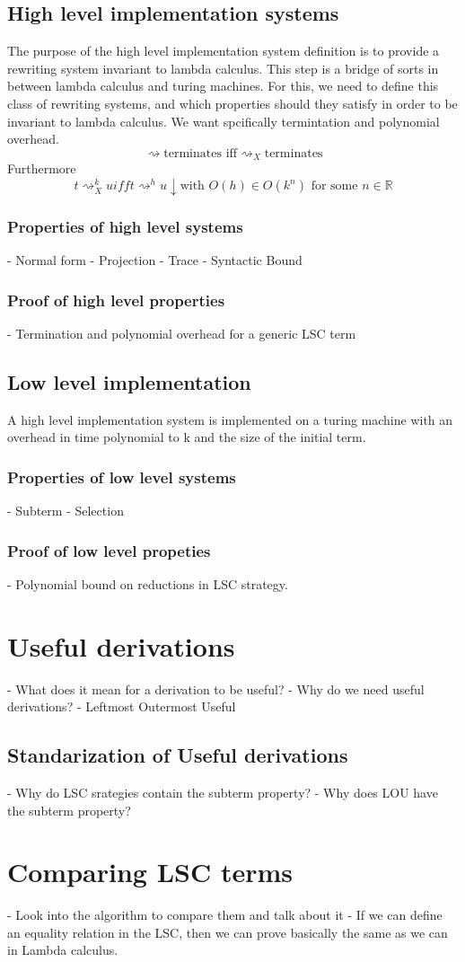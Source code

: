 \documentclass[12pt]{article}
\begin{document}
\subsection{High level implementation systems}
The purpose of the high level implementation system definition is to provide a rewriting system invariant to lambda calculus. This step is a bridge of sorts in between lambda calculus and turing machines. For this, we need to define this class of rewriting systems, and which properties should they satisfy in order to be invariant to lambda calculus. We want spcifically termintation and polynomial overhead.
$$\rightsquigarrow \text{terminates iff} {\rightsquigarrow}_{X} \text{terminates}$$
Furthermore
$$t {\rightsquigarrow}_{X}^k u iff t {\rightsquigarrow}^h u\downarrow \text{with } O(h) \in O(k^n) \text{ for some } n \in \mathbb{R} $$
\subsubsection{Properties of high level systems}
- Normal form
- Projection
- Trace
- Syntactic Bound
\subsubsection{Proof of high level properties}
- Termination and polynomial overhead for a generic LSC term
\subsection{Low level implementation}
A high level implementation system is implemented on a turing machine with an overhead in time polynomial to k and the size of the initial term.
\subsubsection{Properties of low level systems}
- Subterm
- Selection
\subsubsection{Proof of low level propeties}
- Polynomial bound on reductions in LSC strategy.
\section{Useful derivations}
- What does it mean for a derivation to be useful?
- Why do we need useful derivations?
- Leftmost Outermost Useful
\subsection{Standarization of Useful derivations}
- Why do LSC srategies contain the subterm property?
- Why does LOU have the subterm property?
\section{Comparing LSC terms}
- Look into the algorithm to compare them and talk about it
- If we can define an equality relation in the LSC, then we can prove basically the same as we can in Lambda calculus.
\end{document}
